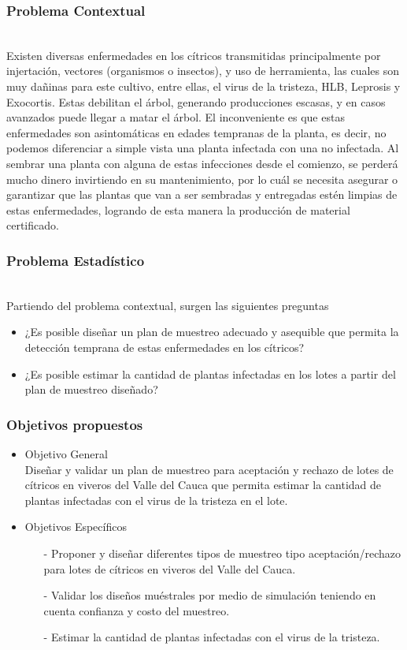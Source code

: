 \documentclass[11pt]{beamer}
\begin{document}
\begin{frame}
\frametitle{Problema Contextual}
~\\Existen diversas enfermedades en los cítricos transmitidas principalmente por injertación, vectores (organismos o insectos), y uso de herramienta, las cuales son muy dañinas para este cultivo, entre ellas, el virus de la tristeza, HLB, Leprosis y Exocortis. Estas debilitan el árbol, generando producciones escasas, y en casos avanzados puede llegar a matar el árbol. El inconveniente es que estas enfermedades son asintomáticas en edades tempranas de la planta, es decir, no podemos diferenciar a simple vista una planta infectada con una no infectada. Al sembrar una planta con alguna de estas infecciones desde el comienzo, se perderá mucho dinero invirtiendo en su mantenimiento, por lo cuál se necesita asegurar o garantizar que las plantas que van a ser sembradas y entregadas estén limpias de estas enfermedades, logrando de esta manera la producción de material certificado.
\end{frame}

\begin{frame}
\frametitle{Problema Estadístico}
~\\Partiendo del problema contextual, surgen las siguientes preguntas
\begin{itemize}
\item ¿Es posible diseñar un plan de muestreo adecuado y asequible que permita la detección temprana de estas enfermedades en los cítricos?
\item ¿Es posible estimar la cantidad de plantas infectadas en los lotes a partir del plan de muestreo diseñado?
\end{itemize}
\end{frame}

\begin{frame}
\frametitle{Objetivos propuestos}
\begin{itemize}
\item Objetivo General
~\\Diseñar y validar un plan de muestreo para aceptación y rechazo de lotes de cítricos en viveros del Valle del Cauca que permita estimar la cantidad de plantas infectadas con el virus de la tristeza en el lote.
\item Objetivos Específicos
\begin{itemize}
\item[-]Proponer y diseñar diferentes tipos de muestreo tipo aceptación/rechazo para lotes de cítricos en viveros del Valle del Cauca.
\item[-]Validar los diseños muéstrales por medio de simulación teniendo en cuenta confianza y costo del muestreo.
\item[-]Estimar la cantidad de plantas infectadas con el virus de la tristeza.
\end{itemize}
\end{itemize}
\end{frame}
\end{document}
